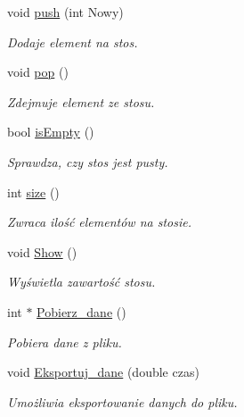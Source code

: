 \begin{DoxyCompactItemize}
\item 
void \hyperlink{class_stos_a918b4f40664e1637dd3ef8e7e9386b24}{push} (int \-Nowy)
\begin{DoxyCompactList}\small\item\em \-Dodaje element na stos. \end{DoxyCompactList}\item 
void \hyperlink{class_stos_a88b0da41b49ef4d4b63cfd4924665683}{pop} ()
\begin{DoxyCompactList}\small\item\em \-Zdejmuje element ze stosu. \end{DoxyCompactList}\item 
bool \hyperlink{class_stos_a328eb30ceb157893dead1a9fe17597b7}{is\-Empty} ()
\begin{DoxyCompactList}\small\item\em \-Sprawdza, czy stos jest pusty. \end{DoxyCompactList}\item 
int \hyperlink{class_stos_a696195d5125d9bbe6b491bc5985f9461}{size} ()
\begin{DoxyCompactList}\small\item\em \-Zwraca ilość elementów na stosie. \end{DoxyCompactList}\item 
void \hyperlink{class_stos_abfb03d80298013a2792bde2fd89c3863}{\-Show} ()
\begin{DoxyCompactList}\small\item\em \-Wyświetla zawartość stosu. \end{DoxyCompactList}\item 
int $\ast$ \hyperlink{class_stos_aa395f48db2ae1b92ac06c1eb566860df}{\-Pobierz\-\_\-dane} ()
\begin{DoxyCompactList}\small\item\em \-Pobiera dane z pliku. \end{DoxyCompactList}\item 
void \hyperlink{class_stos_a757f4fb37152efb0e8600ef45284a2a6}{\-Eksportuj\-\_\-dane} (double czas)
\begin{DoxyCompactList}\small\item\em \-Umożliwia eksportowanie danych do pliku. \end{DoxyCompactList}\end{DoxyCompactItemize}
